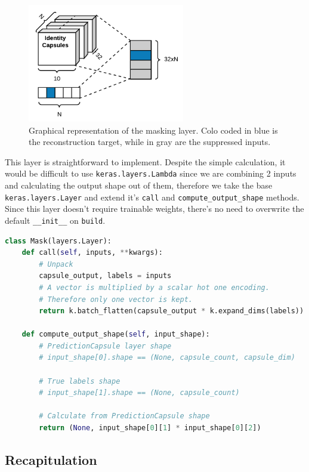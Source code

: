 \begin{figure}[ht]
    \centering
    \includegraphics[height=14em]{obrazky-figures/my_mask.pdf}
    \caption{Graphical representation of the masking layer. Colo coded in blue is the reconstruction target, while in gray are the suppressed inputs.}
    \label{fig:mask}
\end{figure}

This layer is straightforward to implement. Despite the simple calculation, it would be difficult to use \texttt{keras.layers.Lambda} since we are combining 2 inputs and calculating the output shape out of them, therefore we take the base \texttt{keras.layers.Layer} and extend it's \texttt{call} and \texttt{compute\_output\_shape} methods. Since this layer doesn't require trainable weights, there's no need to overwrite the default \texttt{\_\_init\_\_} on \texttt{build}.

\begin{lstlisting}[language=Python, caption=Masking layer]
class Mask(layers.Layer):
    def call(self, inputs, **kwargs):
        # Unpack
        capsule_output, labels = inputs
        # A vector is multiplied by a scalar hot one encoding.
        # Therefore only one vector is kept.
        return k.batch_flatten(capsule_output * k.expand_dims(labels))

    def compute_output_shape(self, input_shape):
        # PredictionCapsule layer shape
        # input_shape[0].shape == (None, capsule_count, capsule_dim)

        # True labels shape
        # input_shape[1].shape == (None, capsule_count)

        # Calculate from PredictionCapsule shape
        return (None, input_shape[0][1] * input_shape[0][2])
\end{lstlisting}


\subsection{Recapitulation}

